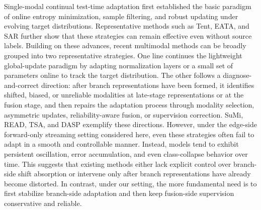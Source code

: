Single-modal continual test-time adaptation first established the basic paradigm of online entropy minimization, sample filtering, and robust updating under evolving target distributions. Representative methods such as Tent, EATA, and SAR \citep{wang2021tent,niu2022eata,niu2023sar} further show that these strategies can remain effective even without source labels. Building on these advances, recent multimodal methods can be broadly grouped into two representative strategies. One line continues the lightweight global-update paradigm by adapting normalization layers or a small set of parameters online to track the target distribution. The other follows a diagnose-and-correct direction: after branch representations have been formed, it identifies shifted, biased, or unreliable modalities at late-stage representations or at the fusion stage, and then repairs the adaptation process through modality selection, asymmetric updates, reliability-aware fusion, or supervision correction. SuMi, READ, TSA, and DASP \citep{guo2025smoothing,yang2024read,chen2025tsa,he2026dasp} exemplify these directions. However, under the edge-side forward-only streaming setting considered here, even these strategies often fail to adapt in a smooth and controllable manner. Instead, models tend to exhibit persistent oscillation, error accumulation, and even class-collapse behavior over time. This suggests that existing methods either lack explicit control over branch-side shift absorption or intervene only after branch representations have already become distorted. In contrast, under our setting, the more fundamental need is to first stabilize branch-side adaptation and then keep fusion-side supervision conservative and reliable.

